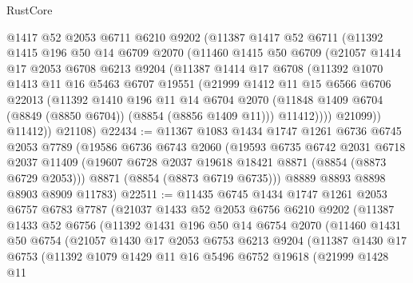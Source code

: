 \begin{lexlean}{RustCore}
\begin{coremodule}
      @1417
      @52
      @2053
      @6711
      @6210
      @9202
      (@11387
        @1417
        @52
        @6711
        (@11392
          @1415
          @196
          @50
          @14
          @6709
          @2070
          (@11460
            @1415
            @50
            @6709
            (@21057
              @1414
              @17
              @2053
              @6708
              @6213
              @9204
              (@11387
                @1414
                @17
                @6708
                (@11392
                  @1070
                  @1413
                  @11
                  @16
                  @5463
                  @6707
                  @19551
                  (@21999
                    @1412
                    @11
                    @15
                    @6566
                    @6706
                    @22013
                    (@11392
                      @1410
                      @196
                      @11
                      @14
                      @6704
                      @2070
                      (@11848 @1409 @6704 (@8849 (@8850 @6704)) (@8854 (@8856 @1409 @11)))
                      @11412))))
              @21099))
          @11412))
      @21108)
@22434 := @11367
    @1083
    @1434
    @1747
    @1261
    @6736
    @6745
    @2053
    @7789
    (@19586
      @6736
      @6743
      @2060
      (@19593
        @6735
        @6742
        @2031
        @6718
        @2037
        @11409
        (@19607 @6728 @2037 @19618 @18421 @8871 (@8854 (@8873 @6729 @2053)))
        @8871
        (@8854 (@8873 @6719 @6735)))
      @8889
      @8893
      @8898
      @8903
      @8909
      @11783)
@22511 := @11435
    @6745
    @1434
    @1747
    @1261
    @2053
    @6757
    @6783
    @7787
    (@21037
      @1433
      @52
      @2053
      @6756
      @6210
      @9202
      (@11387
        @1433
        @52
        @6756
        (@11392
          @1431
          @196
          @50
          @14
          @6754
          @2070
          (@11460
            @1431
            @50
            @6754
            (@21057
              @1430
              @17
              @2053
              @6753
              @6213
              @9204
              (@11387
                @1430
                @17
                @6753
                (@11392
                  @1079
                  @1429
                  @11
                  @16
                  @5496
                  @6752
                  @19618
                  (@21999
                    @1428
                    @11

\end{coremodule}
\end{lexlean}

